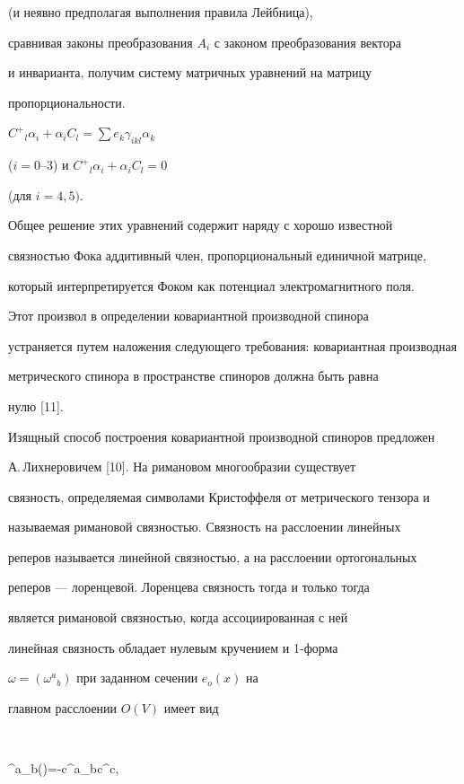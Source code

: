 (и неявно предполагая выполнения правила Лейбница),


сравнивая законы преобразования $A_i$ с законом преобразования вектора


и инварианта, получим систему матричных уравнений на матрицу


пропорциональности.


${C^{+}{_l}{\alpha_i}+{\alpha_i}{C_l}={\sum{e_k}\gamma_{ikl}


\alpha_k}}$


($i=0$--3) и ${C^{+}{_l}{\alpha_i}+{\alpha_i}{C_l}=0}$


(для $i=4,5).$


Общее решение этих уравнений содержит наряду с хорошо известной


связностью Фока аддитивный член, пропорциональный единичной матрице,


который интерпретируется Фоком как потенциал электромагнитного поля.


Этот произвол в определении ковариантной производной спинора


устраняется путем наложения следующего требования: ковариантная производная


метрического спинора в пространстве спиноров должна быть равна


нулю [11].





Изящный способ построения ковариантной производной спиноров предложен


А.\,Лих\-не\-ро\-ви\-чем [10]. На римановом многообразии существует


связность, определяемая символами Кристоффеля от метрического тензора и


называемая римановой связностью. Связность на расслоении линейных


реперов называется линейной связностью, а на расслоении ортогональных


реперов --- лоренцевой. Лоренцева связность тогда и только тогда


является римановой связностью, когда ассоциированная с ней


линейная связность обладает нулевым кручением и 1-форма


$\omega=(\omega^a{}_b)$ при заданном сечении $e_o(x)$ на


главном расслоении $O(V)$ имеет вид


$$


\omega^a{}_b(\xi)=-c^a{}_{bc}\xi^c,


